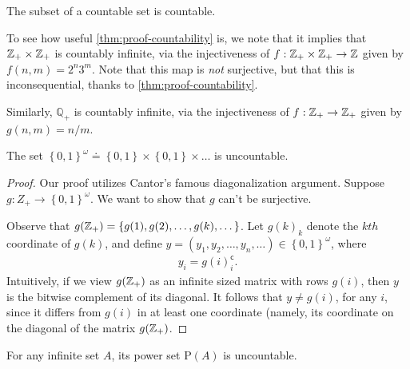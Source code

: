 \begin{corollary}
	The subset of a countable set is countable.	
\end{corollary}

To see how useful \cref{thm:proof-countability} is, we note that it implies that
$\mathbb{Z}_{+} \times \mathbb{Z}_{+}$ is countably infinite, via the injectiveness of $f:
\mathbb{Z}_{+} \times \mathbb{Z}_{+} \to \mathbb{Z}$ given by $f(n,m) = 2^{n} 3^{m}$. Note that this
map is \emph{not} surjective, but that this is inconsequential, thanks to 
\cref{thm:proof-countability}.

Similarly, $\mathbb{Q}_{+}$ is countably infinite, via the injectiveness
of $f: \mathbb{Z}_{+} \to \mathbb{Z}_{+}$ given by $g(n,m) = n/m$.
\begin{theorem}\label{thm:cantor}
	The set $\left\{ 0,1 \right\}^{\omega} \doteq \left\{ 0,1 \right\} \times
	\left\{ 0,1 \right\} \times \dots$ is uncountable.
\end{theorem}
\begin{proof}
	Our proof utilizes Cantor's famous diagonalization argument. 
	Suppose $g: Z_{+} \to \left\{ 0,1 \right\}^{\omega}$. We want to show that
	$g$ can't be surjective. 

	Observe that $g(\mathbb{Z}_{+}) = \left\{ g(1), g(2), \dots, g(k), \dots \right\}$.
	Let $g(k)_{k}$ denote the $kth$ coordinate of $g(k)$, and define
	$y = (y_{1}, y_{2}, \dots, y_{n}, \dots) \in \left\{ 0,1 \right\}^{\omega}$,
	where
	\begin{equation*}
	\begin{split}
		y_{i} = g(i)_{i}^{\mathsf{c}}.
	\end{split}
	\end{equation*}
	Intuitively, if we view $g(\mathbb{Z}_{+})$ as an infinite sized matrix with rows
	$g(i)$, then $y$ is the bitwise complement of its diagonal. It follows that
	$y \neq g(i)$, for any $i$, since it differs from $g(i)$ in at least one
	coordinate (namely, its coordinate on the diagonal of the matrix
		$g(\mathbb{Z}_{+})$. 
\end{proof}
\begin{corollary}
	For any infinite set $A$, its power set $\mathrm{P}(A)$ is uncountable.
\end{corollary}
